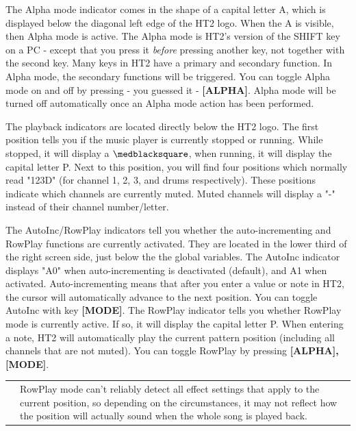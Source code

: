 \documentclass[12pt]{report}	%
\newcommand*{\TakeFourierOrnament}[1]{{%
\fontencoding{U}\fontfamily{futs}\selectfont\char#1}}
\newcommand*{\danger}{\TakeFourierOrnament{66}}
\begin{document}
The Alpha mode indicator comes in the shape of a capital letter A, which is displayed below the diagonal left edge of the HT2 logo. When the A is visible, then Alpha mode is active. The Alpha mode is HT2's version of the SHIFT key on a PC - except that you press it \emph{before} pressing another key, not together with the second key.
Many keys in HT2 have a primary and secondary function. In Alpha mode, the secondary functions will be triggered. You can toggle Alpha mode on and off by pressing - you guessed it - \textbf{[ALPHA]}. Alpha mode will be turned off automatically once an Alpha mode action has been performed.

The playback indicators are located directly below the HT2 logo. The first position tells you if the music player is currently stopped or running. While stopped, it will display a \(\medblacksquare\), when running, it will display the capital letter P. Next to this position, you will find four positions which normally read "123D" (for channel 1, 2, 3, and drums respectively). These positions indicate which channels are currently muted. Muted channels will display a "-" instead of their channel number/letter.

The AutoInc/RowPlay indicators tell you whether the auto-incrementing and RowPlay functions are currently activated. They are located in the lower third of the right screen side, just below the the global variables. The AutoInc indicator displays "A0" when auto-incrementing is deactivated (default), and A1 when activated. Auto-incrementing means that after you enter a value or note in HT2, the cursor will automatically advance to the next position. You can toggle AutoInc with key \textbf{[MODE]}. The RowPlay indicator tells you whether RowPlay mode is currently active. If so, it will display the capital letter P. When entering a note, HT2 will automatically play the current pattern position (including all channels that are not muted). You can toggle RowPlay by pressing \textbf{[ALPHA], [MODE]}. \newline

\begin{tabularx}{\textwidth}{m{} X}
\Huge{\textcolor{red}{\newline\danger}} & RowPlay mode can't reliably detect all effect settings that apply to the current position, so depending on the circumstances, it may not reflect how the position will actually sound when the whole song is played back. \\
\end{tabularx} ~\\
\end{document}
